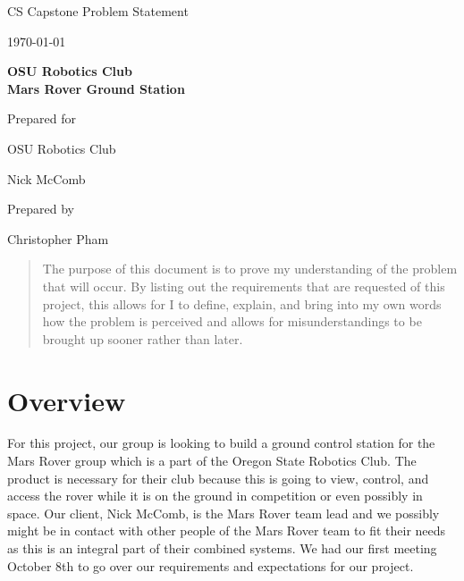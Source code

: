 \documentclass[onecolumn, draftclsnofoot, 10pt, compsoc]{IEEEtran}
\def \CapstoneTeamName{			}
\def \GroupMemberOne{			Kenneth Steinfeldt}
\def \GroupMemberTwo{			Christopher Pham}
\def \GroupMemberThree{			Corwin Perren}
\def \CapstoneProjectName{		OSU Robotics Club\\Mars Rover Ground Station}
\def \CapstoneSponsorCompany{	OSU Robotics Club}
\def \CapstoneSponsorPerson{	Nick McComb}
\def \DocType{		Problem Statement
				}
\newcommand{\NameSigPair}[1]{\par
\makebox[2.75in][r]{#1} \hfil 	\makebox[3.25in]{\makebox[2.25in]{\hrulefill} \hfill		\makebox[.75in]{\hrulefill}}
\par\vspace{-12pt} \textit{\tiny\noindent
\makebox[2.75in]{} \hfill		\makebox[3.25in]{\makebox[2.25in][r]{Signature} \hfill	\makebox[.75in][r]{Date}}}}
\renewcommand{\NameSigPair}[1]{#1}
\begin{document}
\begin{titlepage}
\begin{singlespace}
		\par\vspace{.25in}
		\centering
		\scshape{
			\huge CS Capstone \DocType \par
			{\large\today}\par
			\vspace{.5in}
			\textbf{\Huge\CapstoneProjectName}\par
			\vfill
			{\large Prepared for}\par
			\Huge \CapstoneSponsorCompany\par
			\vspace{5pt}
			{\Large\NameSigPair{\CapstoneSponsorPerson}\par}
			{\large Prepared by }\par
			Christopher Pham\par
			\vspace{5pt}
		}
		\begin{abstract}
			The purpose of this document is to prove my understanding of the problem that will occur. By listing out the requirements that are requested of this project, this allows for I to define, explain, and bring into my own words how the problem is perceived and allows for misunderstandings to be brought up sooner rather than later. 
		\end{abstract}
	\end{singlespace}
\end{titlepage}
\newpage
{}
\tableofcontents
\clearpage

\section{Overview}
For this project, our group is looking to build a ground control station for the Mars Rover group which is a part of the Oregon State Robotics Club. The product is necessary for their club because this is going to view, control, and access the rover while it is on the ground in competition or even possibly in space. Our client, Nick McComb, is the Mars Rover team lead and we possibly might be in contact with other people of the Mars Rover team to fit their needs as this is an integral part of their combined systems. We had our first meeting October 8th to go over our requirements and expectations for our project.
\end{document}
